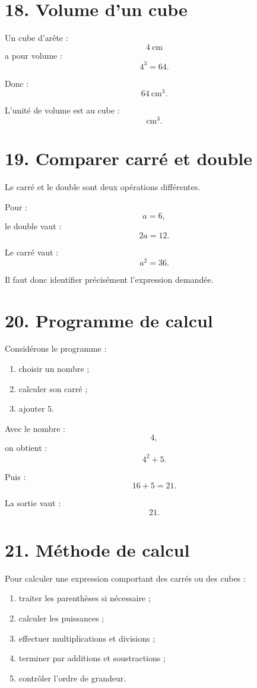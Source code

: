 \section{18. Volume d'un cube}

Un cube d'arête :
\[
4\ \text{cm}
\]
a pour volume :
\[
4^3=64.
\]

Donc :
\[
\boxed{64\ \text{cm}^3}.
\]

L'unité de volume est au cube :
\[
\text{cm}^3.
\]

\section{19. Comparer carré et double}

Le carré et le double sont deux opérations différentes.

Pour :
\[
a=6,
\]
le double vaut :
\[
2a=12.
\]

Le carré vaut :
\[
a^2=36.
\]

Il faut donc identifier précisément l'expression demandée.

\section{20. Programme de calcul}

Considérons le programme :
\begin{enumerate}
\item choisir un nombre ;
\item calculer son carré ;
\item ajouter $5$.
\end{enumerate}

Avec le nombre :
\[
4,
\]
on obtient :
\[
4^2+5.
\]

Puis :
\[
16+5=21.
\]

La sortie vaut :
\[
\boxed{21}.
\]

\section{21. Méthode de calcul}

\begin{methode}
Pour calculer une expression comportant des carrés ou des cubes :
\begin{enumerate}
\item traiter les parenthèses si nécessaire ;
\item calculer les puissances ;
\item effectuer multiplications et divisions ;
\item terminer par additions et soustractions ;
\item contrôler l'ordre de grandeur.
\end{enumerate}
\end{methode}

